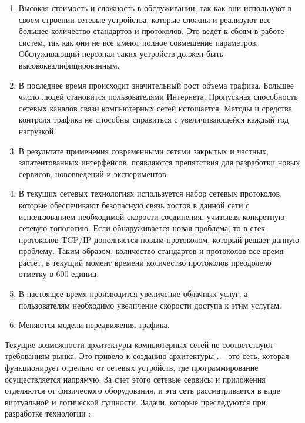 \documentclass[bachelor, och, coursework]{SCWorks}
\begin{document}
\begin{enumerate}
\item Высокая стоимость и сложность в обслуживании, так как они используют в своем строении сетевые устройства, которые сложны и реализуют все большее количество стандартов и протоколов. Это ведет к сбоям в работе систем, так как они не все имеют полное совмещение параметров. Обслуживающий персонал таких устройств должен быть высококвалифицированным.
\item В последнее время происходит значительный рост объема трафика. Большее число людей становится пользователями Интернета. Пропускная способность сетевых каналов связи компьютерных сетей истощается. Методы и средства контроля трафика не способны справиться с увеличивающейся каждый год нагрузкой.
\item В результате применения современными сетями закрытых и частных, запатентованных интерфейсов, появляются препятствия для разработки новых сервисов, нововведений и экспериментов.
\item В текущих сетевых технологиях используется набор сетевых протоколов, которые обеспечивают безопасную связь хостов в данной сети с использованием необходимой скорости соединения, учитывая конкретную сетевую топологию. Если обнаруживается новая проблема, то в стек протоколов TCP/IP дополняется новым протоколом, который решает данную проблему. Таким образом, количество стандартов и протоколов все время растет, в текущий момент времени количество протоколов преодолело отметку в 600 единиц.
\item В настоящее время производится увеличение облачных услуг, а пользователям необходимо увеличение скорости доступа к этим услугам.
\item Меняются модели передвижения трафика.
\end{enumerate}
Текущие возможности архитектуры компьютерных сетей не соответствуют требованиям рынка. Это привело к созданию архитектуры .  – это сеть, которая функционирует отдельно от сетевых устройств, где программирование осуществляется напрямую. За счет этого сетевые сервисы и приложения отделяются от физического оборудования, и эта сеть рассматривается в виде виртуальной и логической сущности.
Задачи, которые преследуются при разработке технологии :
\end{document}
